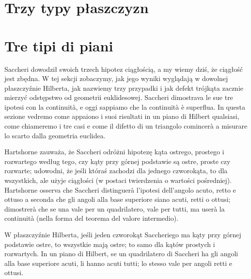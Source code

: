 
\section{Trzy typy płaszczyzn} %
\section{Tre tipi di piani} %
\label{sekcja_trzy_typy}

Saccheri dowodził swoich trzech hipotez ciągłością, a my wiemy dziś, że ciągłość jest zbędna. %
W tej sekcji zobaczymy, jak jego wyniki wyglądają w dowolnej płaszczyźnie Hilberta, jak nazwiemy trzy przypadki i jak defekt trójkąta zacznie mierzyć odstępstwo od geometrii euklidesowej. %
Saccheri dimostrava le sue tre ipotesi con la continuità, e oggi sappiamo che la continuità è superflua. %
In questa sezione vedremo come appaiono i suoi risultati in un piano di Hilbert qualsiasi, come chiameremo i tre casi e come il difetto di un triangolo comincerà a misurare lo scarto dalla geometria euclidea. %

Hartshorne \cite[s. 307]{hartshorne_2000} zauważa, że Saccheri odróżni hipotezę kąta ostrego, prostego i rozwartego według tego, czy kąty przy górnej podstawie są ostre, proste czy rozwarte; udowodni, że jeśli któraś zachodzi dla jednego czworokąta, to dla wszystkich, ale użyje ciągłości (w postaci twierdzenia o wartości pośredniej). %
Hartshorne \cite[p. 307]{hartshorne_2000} osserva che Saccheri distinguerà l'ipotesi dell'angolo acuto, retto e ottuso a seconda che gli angoli alla base superiore siano acuti, retti o ottusi; dimostrerà che se una vale per un quadrilatero, vale per tutti, ma userà la continuità (nella forma del teorema del valore intermedio). %

\begin{theorem}
[Saccheriego] %
[di Saccheri] %
	W płaszczyźnie Hilberta, jeśli jeden czworokąt Saccheriego ma kąty przy górnej podstawie ostre, to wszystkie mają ostre; to samo dla kątów prostych i rozwartych. %
	In un piano di Hilbert, se un quadrilatero di Saccheri ha gli angoli alla base superiore acuti, li hanno acuti tutti; lo stesso vale per angoli retti e ottusi. %
\end{theorem}

